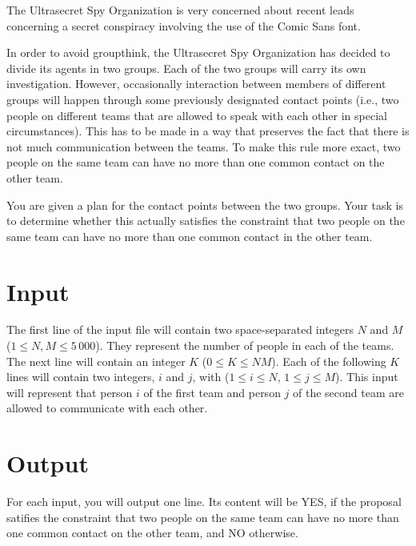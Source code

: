 
The Ultrasecret Spy Organization is very concerned about recent leads
concerning a secret conspiracy involving the use of the Comic Sans font.

In order to avoid groupthink, the Ultrasecret Spy Organization has decided to
divide its agents in two groups. Each of the two groups will carry its own
investigation. However, occasionally interaction between members of different
groups will happen through some previously designated contact points (i.e., two
people on different teams that are allowed to speak with each other in special
circumstances). This has to be made in a way that preserves the fact that there
is not much communication between the teams. To make this rule more exact, two
people on the same team can have no more than one common contact on the other
team.

You are given a plan for the contact points between the two groups. Your task
is to determine whether this actually satisfies the constraint that two people
on the same team can have no more than one common contact in the other team.

\section*{Input}

The first line of the input file will contain two space-separated integers $N$
and $M$ ($1 \leq N, M \leq 5\,000$). They represent the number of people in each of the
teams. The next line will contain an integer $K$ ($0 \leq K \leq NM$). Each of the
following $K$ lines will contain two integers, $i$ and $j$, with ($1 \leq i \leq N$, $1 \leq j \leq M$).
This input will represent that person $i$ of the first team and person $j$ of the
second team are allowed to communicate with each other.

\section*{Output}

For each input, you will output one line. Its content will be YES, if the
proposal satifies the constraint that two people on the same team can have no
more than one common contact on the other team, and NO otherwise.
